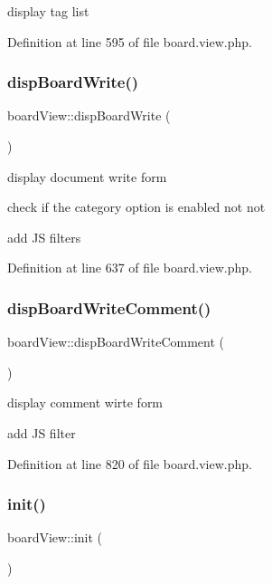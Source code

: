 display tag list 



Definition at line 595 of file board.\+view.\+php.

\hypertarget{classboardView_a87d07de32e6b22b5b56eaa0e0f55e2a0}{}\label{classboardView_a87d07de32e6b22b5b56eaa0e0f55e2a0} 
\subsubsection{\texorpdfstring{disp\+Board\+Write()}{dispBoardWrite()}}
{\footnotesize\ttfamily board\+View\+::disp\+Board\+Write (\begin{DoxyParamCaption}{ }\end{DoxyParamCaption})}



display document write form 

check if the category option is enabled not not

add JS filters

Definition at line 637 of file board.\+view.\+php.

\hypertarget{classboardView_a8101f306b736fb983f9404f8c9e380f6}{}\label{classboardView_a8101f306b736fb983f9404f8c9e380f6} 
\subsubsection{\texorpdfstring{disp\+Board\+Write\+Comment()}{dispBoardWriteComment()}}
{\footnotesize\ttfamily board\+View\+::disp\+Board\+Write\+Comment (\begin{DoxyParamCaption}{ }\end{DoxyParamCaption})}



display comment wirte form 

add JS filter

Definition at line 820 of file board.\+view.\+php.

\hypertarget{classboardView_afadb8aaf62eac0f18bf8200e15d9fe6a}{}\label{classboardView_afadb8aaf62eac0f18bf8200e15d9fe6a} 
\subsubsection{\texorpdfstring{init()}{init()}}
{\footnotesize\ttfamily board\+View\+::init (\begin{DoxyParamCaption}{ }\end{DoxyParamCaption})}



